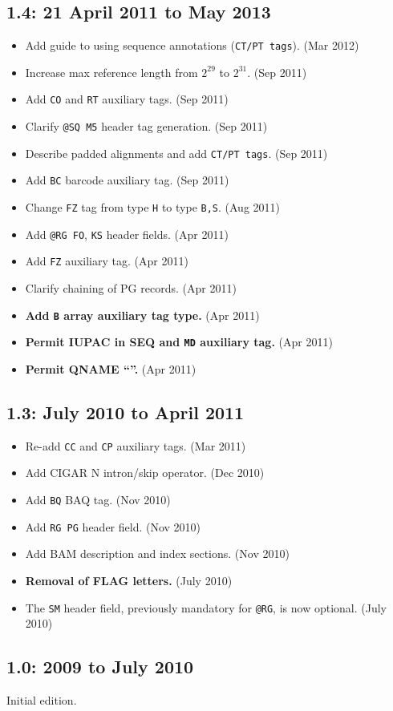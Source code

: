 \documentclass[10pt]{article}
\begin{document}
\begin{appendices}
\subsection*{1.4: 21 April 2011 to May 2013}

\begin{itemize}
\item Add guide to using sequence annotations ({\tt CT/PT tags}). (Mar 2012)
\item Increase max reference length from $2^{29}$ to $2^{31}$. (Sep
  2011)
\item Add {\tt CO} and {\tt RT} auxiliary tags. (Sep 2011)
\item Clarify {\tt @SQ M5} header tag generation. (Sep 2011)
\item Describe padded alignments and add {\tt CT/PT tags}. (Sep 2011)
\item Add {\tt BC} barcode auxiliary tag. (Sep 2011)
\item Change {\tt FZ} tag from type {\tt H} to type {\tt B,S}. (Aug 2011)
\item Add {\tt @RG FO}, {\tt KS} header fields. (Apr 2011)
\item Add {\tt FZ} auxiliary tag. (Apr 2011)
\item Clarify chaining of PG records. (Apr 2011)
\item \textbf{Add {\tt B} array auxiliary tag type.} (Apr 2011)\
\item \textbf{Permit IUPAC in SEQ and {\tt MD} auxiliary tag.} (Apr 2011)
\item \textbf{Permit QNAME ``{\tt *}''.} (Apr 2011)
\end{itemize}

\subsection*{1.3: July 2010 to April 2011}

\begin{itemize}
\item Re-add {\tt CC} and {\tt CP} auxiliary tags. (Mar 2011)
\item Add CIGAR N intron/skip operator. (Dec 2010)
\item Add {\tt BQ} BAQ tag. (Nov 2010)
\item Add {\tt RG PG} header field. (Nov 2010)
\item Add BAM description and index sections. (Nov 2010)
\item \textbf{Removal of FLAG letters.} (July 2010)
\item The {\tt SM} header field, previously mandatory for {\tt @RG}, is now
optional. (July 2010)
\end{itemize}

\subsection*{1.0: 2009 to July 2010}

Initial edition.

\end{appendices}
\end{document}
